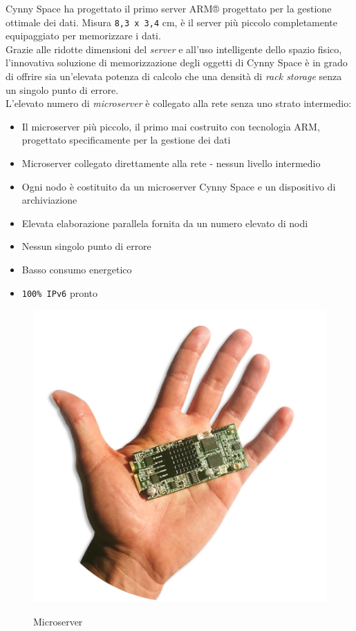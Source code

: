 Cynny Space ha progettato il primo server ARM® progettato per la gestione ottimale dei dati. Misura \verb"8,3 x 3,4" cm, \`{e} il server pi\`{u} piccolo completamente equipaggiato per memorizzare i dati. \\
Grazie alle ridotte dimensioni del \textit{server} e all'uso intelligente dello spazio fisico, l'innovativa soluzione di memorizzazione degli oggetti di Cynny Space \`{e} in grado di offrire sia un'elevata potenza di calcolo che una densit\`{a} di \textit{rack storage} senza un singolo punto di errore. \\
L'elevato numero di \textit{microserver} \`{e} collegato alla rete senza uno strato intermedio:
\begin{itemize}
\item 
Il microserver pi\`{u} piccolo, il primo mai costruito con tecnologia ARM, progettato specificamente per la gestione dei dati
\item
Microserver collegato direttamente alla rete - nessun livello intermedio
\item
Ogni nodo \`{e} costituito da un microserver Cynny Space e un dispositivo di archiviazione
\item
Elevata elaborazione parallela fornita da un numero elevato di nodi
\item
Nessun singolo punto di errore
\item
Basso consumo energetico
\item 
\verb"100% IPv6" pronto
\end{itemize}

\begin{figure}[htbp]
\centering
\includegraphics[scale=0.50]{img/Server.png}\\
\caption{Microserver \label{figura1.13}}
\end{figure}